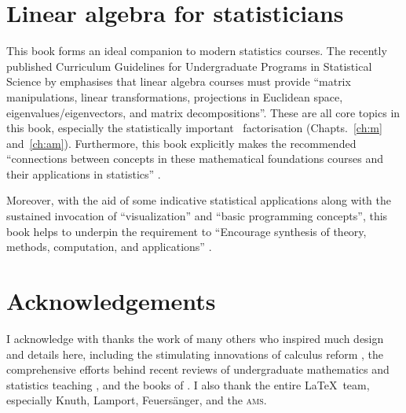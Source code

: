 \section*{Linear algebra for statisticians}

This book forms an ideal companion to modern statistics courses.
The recently published Curriculum Guidelines for Undergraduate Programs in Statistical Science by \cite{StatsEduGuidelines2014} emphasises that linear algebra courses must provide ``matrix manipulations, linear transformations, projections in Euclidean space, eigenvalues\slash eigenvectors, and matrix decompositions''.
These are all core topics in this book, especially the statistically important \svd\ factorisation (Chapts.~\ref{ch:m} and~\ref{ch:am}).
Furthermore, this book explicitly makes the recommended ``connections between concepts in these mathematical foundations courses and their applications in statistics'' \cite[p.12]{StatsEduGuidelines2014}.

Moreover, with the aid of some indicative statistical applications along with the sustained invocation of ``visualization'' and  ``basic programming concepts'', this book helps to underpin the requirement to ``Encourage synthesis of theory, methods, computation, and applications'' \cite[p.13]{StatsEduGuidelines2014}.






\section*{Acknowledgements}

I acknowledge with thanks the work of many others who inspired much design and details here, including 
the stimulating innovations of calculus reform \cite[e.g.]{HughesHallett2013},  
the comprehensive efforts behind recent reviews of  undergraduate mathematics and statistics teaching \cite[e.g.]{Alpers2013, Bressoud2014, Turner2014, StatsEduGuidelines2014, CUPMguide2015, gaimme2016}, 
and the books of \cite{Anton6, Davis99a, Holt2013, Larson2013, Lay2012, Nakos1998, Poole2015, Will04}.
I also thank the entire \LaTeX\ team, especially Knuth, Lamport, Feuers\"anger, and the \textsc{ams}.








